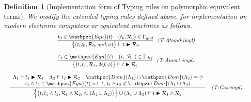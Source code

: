 \documentclass[12pt]{article}
\newtheorem{Definition}{Definition}[section]
\begin{document}
\pagebreak
\begin{Definition}[Implementation form of Typing rules on
    polymorphic equivalent terms]
  We modify the extended typing rules defined above, for implementation on
  modern electronic computers or equivalent machines as follows.
  \begin{displaymath}
    \begin{array}{c}

      \begin{array}{rl}
        \dfrac{
          t_0 \in \mathpzc{Equ}(t)
           \quad (t_0, \mathcal{R}_0) \in \Gamma_\text{\it gnd}
        }{
          \bigl\{(t, t_0, \mathcal{R}_0, \text{\it gnd}, \phi ) \bigr\}
           \vdash t \blacktriangleright \mathcal{R}_0
        }  &  \!\!\text{\it (T-Atom0-impl)}
      \end{array}  \\
      \\

      \begin{array}{rl}
        \dfrac{
          t_1 \in \mathpzc{Equ}(t)
           \quad (t_1, \mathcal{R}_1) \in \Gamma_\text{\it def}
        }{
          \bigl\{(t, t_1, \mathcal{R}_1, \text{\it def}, \phi ) \bigr\}
           \vdash t \blacktriangleright \mathcal{R}_1
        }  &  \!\!\text{\it (T-Atom1-impl)}
      \end{array}  \\
      \\
      
      \begin{array}{rl}
        \dfrac{
          \begin{array}{c}
            \Lambda_1 \vdash t_1 \blacktriangleright \mathcal{R}_1
             \quad \Lambda_2 \vdash t_2 \blacktriangleright \mathcal{R}_2
              \quad \mathpzc{Dom}(\Lambda_1) \cap \mathpzc{Dom}(\Lambda_2)
               = \phi  \\
            t_1 \wedge t_2 \in \mathpzc{Equ}(t)\
             \text{\it s.t.}\ t,\, t_1 \wedge t_2 \not\in \mathpzc{Dom}(
              \Lambda_1 \cup \Lambda_2)
          \end{array}
        }{
          \Bigl\{\bigl(t, t_1 \wedge t_2,
           \mathcal{R}_1 \wedge \mathcal{R}_2, \wedge,
            (\Lambda_1 \cup \Lambda_2) \bigr) \Bigr\}
             \cup (\Lambda_1 \cup \Lambda_2) \vdash
              t \blacktriangleright \mathcal{R}_1 \wedge \mathcal{R}_2
        }  &  \text{\it (T-Cas-impl)}
      \end{array}  \\
      \\
      

\end{array}
\end{displaymath}
\end{Definition}
\end{document}
